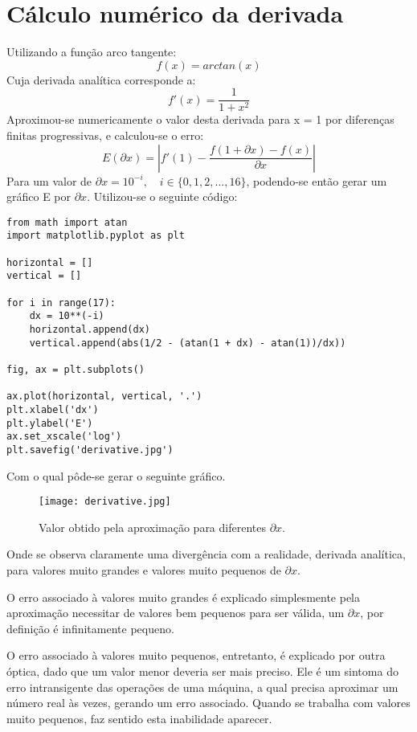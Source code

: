 \documentclass{article}[twocolumn]
\begin{document}
	\section{C\'alculo num\'erico da derivada}
	Utilizando a fun\c{c}\~ao arco tangente:
	\begin{equation}
		f(x) = arctan(x)
		\nonumber
	\end{equation}
	Cuja derivada anal\'itica corresponde a:
	\begin{equation}
		f'(x) = \frac{1}{1 + x^2}
		\nonumber
	\end{equation}
	Aproximou-se numericamente o valor desta derivada para x = 1 por diferen\c{c}as
	finitas progressivas, e calculou-se o erro:
	\begin{equation}
		E(\partial x) = \left|
		f'(1) - \frac{f(1 + \partial x) - f(x)}{\partial x}
		\right|
		\nonumber
	\end{equation}
	Para um valor de $\partial x = 10^{-i}, \quad i \in \{0, 1, 2, ..., 16\}$, podendo-se
	ent\~ao gerar um gr\'afico E por $\partial x$. Utilizou-se o seguinte c\'odigo:
	\begin{verbatim}
from math import atan
import matplotlib.pyplot as plt

horizontal = []
vertical = []

for i in range(17):
    dx = 10**(-i)
    horizontal.append(dx)
    vertical.append(abs(1/2 - (atan(1 + dx) - atan(1))/dx))

fig, ax = plt.subplots()

ax.plot(horizontal, vertical, '.')
plt.xlabel('dx')
plt.ylabel('E')
ax.set_xscale('log')
plt.savefig('derivative.jpg')

	\end{verbatim}
	Com o qual p\^ode-se gerar o seguinte gr\'afico.
	\begin{figure}[H]
		\centering
		\texttt{[image: derivative.jpg]}
		\caption{Valor obtido pela aproxima\c{c}\~ao para diferentes $\partial x$.}
	\end{figure}
	Onde se observa claramente uma diverg\^encia com a realidade, derivada anal\'itica, para
	valores muito grandes e valores muito pequenos de $\partial x$.
	
	O erro associado \`a valores muito grandes \'e explicado simplesmente pela aproxima\c{c}\~ao
	necessitar de valores bem pequenos para ser v\'alida, um $\partial x$, por defini\c{c}\~ao
	\'e infinitamente pequeno.

	O erro associado \`a valores muito pequenos, entretanto, \'e explicado por outra
	\'optica, dado que um valor menor deveria ser mais preciso. Ele \'e um sintoma do erro
	intransigente das opera\c{c}\~oes de uma m\'aquina, a qual precisa aproximar um n\'umero real
	\`as vezes, gerando um erro associado. Quando se trabalha com valores muito pequenos,
	faz sentido esta inabilidade aparecer.
\end{document}
